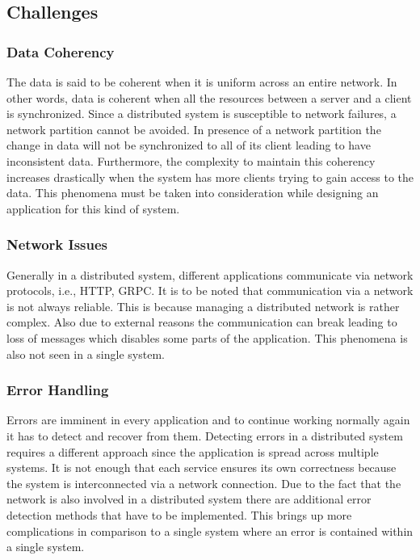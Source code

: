     \subsection{Challenges}    
        \label{subsection: distriChallenges}
        \subsubsection{Data Coherency}
        The data is said to be coherent when it is uniform across an entire network. In other words, data is coherent when all
        the resources between a server and a client is synchronized. 
        Since a distributed system is susceptible to network failures, a network partition \cite[p.~59]{CAP} cannot be avoided. In presence
        of a network partition the change in data will not be synchronized to all of its client leading to have inconsistent data. Furthermore, the
        complexity to maintain this coherency increases drastically when the system has more clients trying to gain access to the data. This phenomena
        must be taken into consideration while designing an application for this kind of system.

        \subsubsection{Network Issues}
        Generally in a distributed system, different applications communicate via network protocols, i.e., HTTP, GRPC. It is to be noted that
        communication via a network is not always reliable. This is because managing a distributed network is rather complex. Also due to
        external reasons the communication can break leading to loss of messages which disables some parts of the application. 
        This phenomena is also not seen in a single system.

        \subsubsection{Error Handling}
        Errors are imminent in every application and to continue working normally again it has to detect and recover from them.
        Detecting errors in a distributed system requires a different approach since the application is spread across multiple systems. 
        It is not enough that each service ensures its own correctness because the system is interconnected via a
        network connection. Due to the fact that the network is also involved in a distributed system there are additional error detection methods that have
        to be implemented. This brings up more complications in comparison to a single system where an error is contained within a single system.

         
